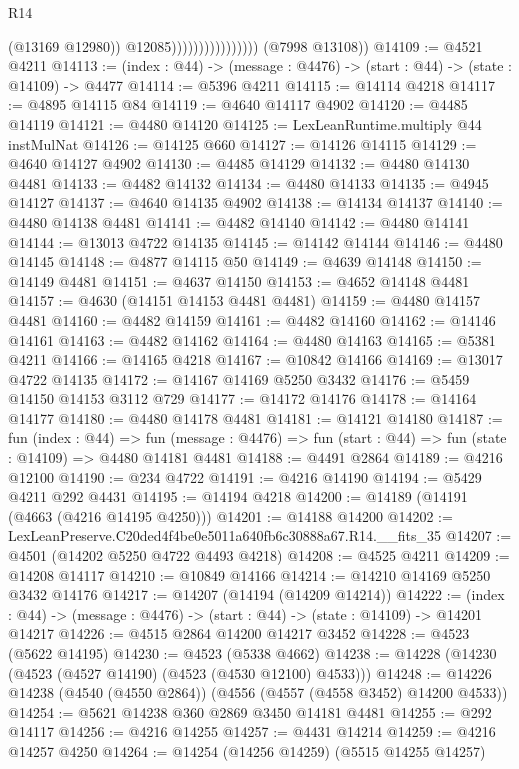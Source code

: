 \begin{lexlean}{R14}
\begin{coremodule}
                                        (@13169 @12980))
                                      @12085))))))))))))))))
      (@7998 @13108))
@14109 := @4521 @4211
@14113 := (index : @44) -> (message : @4476) -> (start : @44) -> (state : @14109) -> @4477
@14114 := @5396 @4211
@14115 := @14114 @4218
@14117 := @4895 @14115 @84
@14119 := @4640 @14117 @4902
@14120 := @4485 @14119
@14121 := @4480 @14120
@14125 := LexLeanRuntime.multiply @44 instMulNat
@14126 := @14125 @660
@14127 := @14126 @14115
@14129 := @4640 @14127 @4902
@14130 := @4485 @14129
@14132 := @4480 @14130 @4481
@14133 := @4482 @14132
@14134 := @4480 @14133
@14135 := @4945 @14127
@14137 := @4640 @14135 @4902
@14138 := @14134 @14137
@14140 := @4480 @14138 @4481
@14141 := @4482 @14140
@14142 := @4480 @14141
@14144 := @13013 @4722 @14135
@14145 := @14142 @14144
@14146 := @4480 @14145
@14148 := @4877 @14115 @50
@14149 := @4639 @14148
@14150 := @14149 @4481
@14151 := @4637 @14150
@14153 := @4652 @14148 @4481
@14157 := @4630 (@14151 @14153 @4481 @4481)
@14159 := @4480 @14157 @4481
@14160 := @4482 @14159
@14161 := @4482 @14160
@14162 := @14146 @14161
@14163 := @4482 @14162
@14164 := @4480 @14163
@14165 := @5381 @4211
@14166 := @14165 @4218
@14167 := @10842 @14166
@14169 := @13017 @4722 @14135
@14172 := @14167 @14169 @5250 @3432
@14176 := @5459 @14150 @14153 @3112 @729
@14177 := @14172 @14176
@14178 := @14164 @14177
@14180 := @4480 @14178 @4481
@14181 := @14121 @14180
@14187 := fun (index : @44) =>
  fun (message : @4476) => fun (start : @44) => fun (state : @14109) => @4480 @14181 @4481
@14188 := @4491 @2864
@14189 := @4216 @12100
@14190 := @234 @4722
@14191 := @4216 @14190
@14194 := @5429 @4211 @292 @4431
@14195 := @14194 @4218
@14200 := @14189 (@14191 (@4663 (@4216 @14195 @4250)))
@14201 := @14188 @14200
@14202 := LexLeanPreserve.C20ded4f4be0e5011a640fb6c30888a67.R14.__fits_35
@14207 := @4501 (@14202 @5250 @4722 @4493 @4218)
@14208 := @4525 @4211
@14209 := @14208 @14117
@14210 := @10849 @14166
@14214 := @14210 @14169 @5250 @3432 @14176
@14217 := @14207 (@14194 (@14209 @14214))
@14222 := (index : @44) -> (message : @4476) -> (start : @44) -> (state : @14109) -> @14201 @14217
@14226 := @4515 @2864 @14200 @14217 @3452
@14228 := @4523 (@5622 @14195)
@14230 := @4523 (@5338 @4662)
@14238 := @14228 (@14230 (@4523 (@4527 @14190) (@4523 (@4530 @12100) @4533)))
@14248 := @14226 @14238 (@4540 (@4550 @2864)) (@4556 (@4557 (@4558 @3452) @14200 @4533))
@14254 := @5621 @14238 @360 @2869 @3450 @14181 @4481
@14255 := @292 @14117
@14256 := @4216 @14255
@14257 := @4431 @14214
@14259 := @4216 @14257 @4250
@14264 := @14254 (@14256 @14259) (@5515 @14255 @14257)

\end{coremodule}
\end{lexlean}

